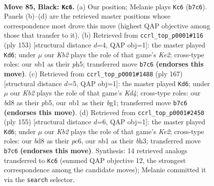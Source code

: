 \documentclass[11pt]{article}
\begin{document}
\clearpage

\begin{figure}[p]\centering
\begin{subfigure}{0.46\textwidth}\centering
\resizebox{\linewidth}{!}{%
\newchessgame
\chessboard[
  setfen={3B4/1k6/8/8/p1p3b1/8/5K2/1N6 b - - 25 85},
  showmover=false,
  pgfstyle=straightmove, color=movearrow, markmove={b7-c6}
]}
\caption{}
\end{subfigure}\hfill
\begin{subfigure}{0.46\textwidth}\centering
\resizebox{\linewidth}{!}{%
\newchessgame
\chessboard[
  setfen={8/4k3/7p/7P/1p1b4/1B6/3K4/8 b - - 12 77},
  showmover=false,
  pgfstyle=straightmove, color=movearrow, markmove={e7-d6}
]}
\caption{}
\end{subfigure}
\\[4pt]
\begin{subfigure}{0.46\textwidth}\centering
\resizebox{\linewidth}{!}{%
\newchessgame
\chessboard[
  setfen={8/8/8/1P1k3b/5p2/8/8/4K1B1 b - - 7 84},
  showmover=false,
  pgfstyle=straightmove, color=movearrow, markmove={d5-d6}
]}
\caption{}
\end{subfigure}\hfill
\begin{subfigure}{0.46\textwidth}\centering
\resizebox{\linewidth}{!}{%
\newchessgame
\chessboard[
  setfen={8/2b1k3/2P5/8/1K5p/7B/8/8 b - - 2 78},
  showmover=false,
  pgfstyle=straightmove, color=movearrow, markmove={e7-d6}
]}
\caption{}
\end{subfigure}
\caption{\textbf{Move 85, Black: \texttt{Kc6}.} (a) Our position; Melanie plays \texttt{Kc6} (\texttt{b7c6}). Panels (b)--(d) are the retrieved master positions whose correspondence most drove this move (highest QAP objective among those that transfer to it). (b) Retrieved from \texttt{ccrl\_top\_p0001\#116} (ply 153) [structural distance $d$=4, QAP obj=1]: the master played \texttt{Kd6}; under $\mu$ our \emph{Kb2} plays the role of that game's \emph{Ke2}; cross-type roles: our \emph{n}b1 as their \emph{p}h5; transferred move \texttt{b7c6} \textbf{(endorses this move)}. (c) Retrieved from \texttt{ccrl\_top\_p0001\#1488} (ply 167) [structural distance $d$=5, QAP obj=1]: the master played \texttt{Kd6}; under $\mu$ our \emph{Kb2} plays the role of that game's \emph{Kd4}; cross-type roles: our \emph{b}d8 as their \emph{p}b5, our \emph{n}b1 as their \emph{b}g1; transferred move \texttt{b7c6} \textbf{(endorses this move)}. (d) Retrieved from \texttt{ccrl\_top\_p0001\#2450} (ply 155) [structural distance $d$=6, QAP obj=1]: the master played \texttt{Kd6}; under $\mu$ our \emph{Kb2} plays the role of that game's \emph{Ke2}; cross-type roles: our \emph{b}d8 as their \emph{p}c6, our \emph{n}b1 as their \emph{b}h3; transferred move \texttt{b7c6} \textbf{(endorses this move)}. Synthesis: 14 retrieved analogs transferred to \texttt{Kc6} (summed QAP objective 12, the strongest correspondence among the candidate moves); Melanie committed it via the \texttt{search} selector.}
\label{fig:thought-m169}
\end{figure}
\end{document}
